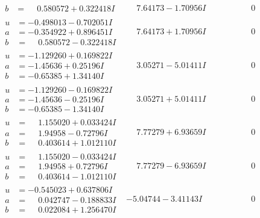 \documentclass[1p]{elsarticle_modified}
\theoremstyle{definition}
\begin{document}
$$\begin{array}{c|c|c}
\begin{aligned}
b &= \phantom{-}0.580572 + 0.322418 I\end{aligned}
 & \phantom{-}7.64173 - 1.70956 I & \phantom{-0.000000 } 0 \\ \hline\begin{aligned}
u &= -0.498013 - 0.702051 I \\
a &= -0.354922 + 0.896451 I \\
b &= \phantom{-}0.580572 - 0.322418 I\end{aligned}
 & \phantom{-}7.64173 + 1.70956 I & \phantom{-0.000000 } 0 \\ \hline\begin{aligned}
u &= -1.129260 + 0.169822 I \\
a &= -1.45636 + 0.25196 I \\
b &= -0.65385 + 1.34140 I\end{aligned}
 & \phantom{-}3.05271 - 5.01411 I & \phantom{-0.000000 } 0 \\ \hline\begin{aligned}
u &= -1.129260 - 0.169822 I \\
a &= -1.45636 - 0.25196 I \\
b &= -0.65385 - 1.34140 I\end{aligned}
 & \phantom{-}3.05271 + 5.01411 I & \phantom{-0.000000 } 0 \\ \hline\begin{aligned}
u &= \phantom{-}1.155020 + 0.033424 I \\
a &= \phantom{-}1.94958 - 0.72796 I \\
b &= \phantom{-}0.403614 + 1.012110 I\end{aligned}
 & \phantom{-}7.77279 + 6.93659 I & \phantom{-0.000000 } 0 \\ \hline\begin{aligned}
u &= \phantom{-}1.155020 - 0.033424 I \\
a &= \phantom{-}1.94958 + 0.72796 I \\
b &= \phantom{-}0.403614 - 1.012110 I\end{aligned}
 & \phantom{-}7.77279 - 6.93659 I & \phantom{-0.000000 } 0 \\ \hline\begin{aligned}
u &= -0.545023 + 0.637806 I \\
a &= \phantom{-}0.042747 - 0.188833 I \\
b &= \phantom{-}0.022084 + 1.256470 I\end{aligned}
 & -5.04744 - 3.41143 I & \phantom{-0.000000 } 0 \\ \hline\begin{aligned}

\end{aligned}
\end{array}$$
\end{document}
